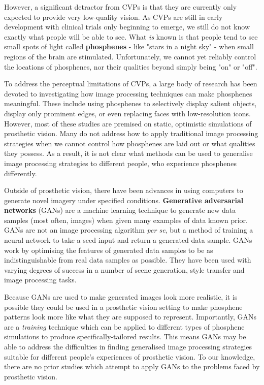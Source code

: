 \documentclass[11pt]{article}
\begin{document}
However, a significant detractor from CVPs is that they are currently only expected to provide very low-quality vision.
As CVPs are still in early development with clinical trials only beginning to emerge, we still do not know exactly what people will be able to see.
What \emph{is} known is that people tend to see small spots of light called \textbf{phosphenes} - like "stars in a night sky" - when small regions of the brain are stimulated.
Unfortunately, we cannot yet reliably control the locations of phosphenes, nor their qualities beyond simply being "on" or "off".

To address the perceptual limitations of CVPs, a large body of research has been devoted to investigating how image processing techniques can make phosphenes meaningful.
These include using phosphenes to selectively display salient objects, display only prominent edges, or even replacing faces with low-resolution icons.
However, most of these studies are premised on static, optimistic simulations of prosthetic vision.
Many do not address how to apply traditional image processing strategies when we cannot control how phosphenes are laid out or what qualities they possess.
As a result, it is not clear what methods can be used to generalise image processing strategies to different people, who experience phosphenes differently.

Outside of prosthetic vision, there have been advances in using computers to generate novel imagery under specified conditions.
\textbf{Generative adversarial networks} (GANs) are a machine learning technique to generate new data samples (most often, images) when given many examples of data known prior.
GANs are not an image processing algorithm \emph{per se}, but a method of training a neural network to take a seed input and return a generated data sample.
GANs work by optimising the features of generated data samples to be as indistinguishable from real data samples as possible.
They have been used with varying degrees of success in a number of scene generation, style transfer and image processing tasks.

Because GANs are used to make generated images look more realistic, it is possible they could be used in a prosthetic vision setting to make phosphene patterns look more like what they are supposed to represent.
Importantly, GANs are a \emph{training} technique which can be applied to different types of phosphene simulations to produce specifically-tailored results.
This means GANs may be able to address the difficulties in finding generalised image processing strategies suitable for different people's experiences of prosthetic vision.
To our knowledge, there are no prior studies which attempt to apply GANs to the problems faced by prosthetic vision.
\end{document}
